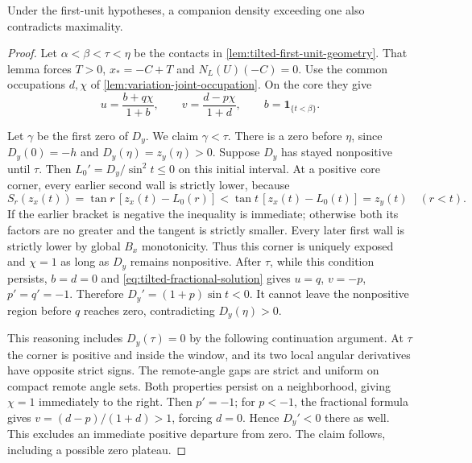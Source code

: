 \begin{lemma}\label{lem:tilted-fold-energy}
Under the first-unit hypotheses, a companion density exceeding
one also contradicts maximality.
\end{lemma}
\begin{proof}
Let $\alpha<\beta<\tau<\eta$ be the contacts in
\cref{lem:tilted-first-unit-geometry}. That lemma forces $T>0$,
$x_*=-C+T$ and $N_L(U)(-C)=0$.
Use the common occupations $d,\chi$ of
\cref{lem:variation-joint-occupation}. On the core they give
\begin{equation}\label{eq:tilted-fractional-solution}
 u=\frac{b+q\chi}{1+b},\qquad
 v=\frac{d-p\chi}{1+d},\qquad b=\mathbf1_{\{t<\beta\}}.
\end{equation}

Let $\gamma$ be the first zero of $D_y$. We claim $\gamma<\tau$.
There is a zero before $\eta$, since $D_y(0)=-h$ and
$D_y(\eta)=z_y(\eta)>0$.
Suppose $D_y$ has stayed nonpositive until $\tau$.
Then $L_0'=D_y/\sin^2t\le0$ on this initial interval.
At a positive core corner, every earlier second wall is
strictly lower, because
\[
 S_r(z_x(t))=\tan r\,[z_x(t)-L_0(r)]
             <\tan t\,[z_x(t)-L_0(t)]=z_y(t)\quad(r<t).
\]
If the earlier bracket is negative the inequality is immediate;
otherwise both its factors are no greater and the tangent is
strictly smaller. Every later first wall is strictly lower by
global $B_x$ monotonicity. Thus this corner is uniquely exposed
and $\chi=1$ as long as $D_y$ remains nonpositive.
After $\tau$, while this condition persists, $b=d=0$ and
\cref{eq:tilted-fractional-solution} gives
$u=q$, $v=-p$, $p'=q'=-1$. Therefore
$D_y'=(1+p)\sin t<0$. It cannot leave the nonpositive region
before $q$ reaches zero, contradicting $D_y(\eta)>0$.

This reasoning includes $D_y(\tau)=0$ by the following
continuation argument. At $\tau$ the corner is positive and
inside the window, and its two local angular derivatives have
opposite strict signs. The remote-angle gaps are strict and
uniform on compact remote angle sets. Both properties persist
on a neighborhood, giving $\chi=1$ immediately to the right.
Then $p'=-1$; for $p<-1$, the fractional formula gives
$v=(d-p)/(1+d)>1$, forcing $d=0$. Hence $D_y'<0$ there as
well. This excludes an immediate positive departure from zero.
The claim follows, including a possible zero plateau.


\end{proof}
